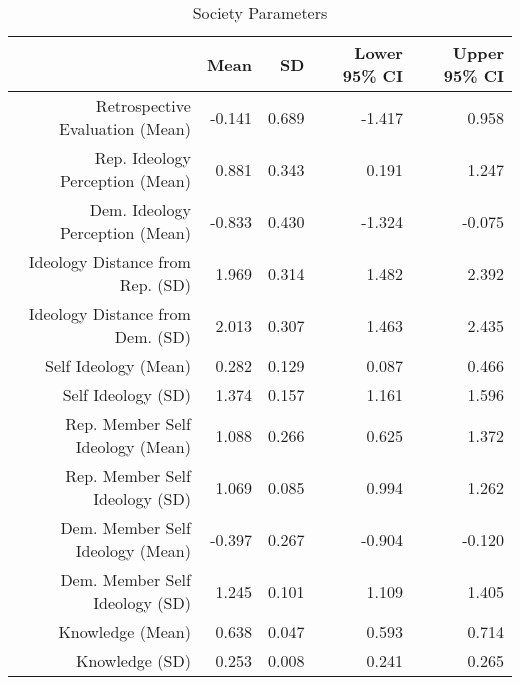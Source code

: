 \begin{table}[h!!!]
\centering
\caption{Society Parameters} 
\label{socparams}
\begin{tabular}{rrrrr}
  \hline
 & Mean & SD & Lower 95\% CI & Upper 95\% CI \\ 
  \hline
Retrospective Evaluation (Mean) & -0.141 & 0.689 & -1.417 & 0.958 \\ 
  Rep. Ideology Perception (Mean) & 0.881 & 0.343 & 0.191 & 1.247 \\ 
  Dem. Ideology Perception (Mean) & -0.833 & 0.430 & -1.324 & -0.075 \\ 
  Ideology Distance from Rep. (SD) & 1.969 & 0.314 & 1.482 & 2.392 \\ 
  Ideology Distance from Dem. (SD) & 2.013 & 0.307 & 1.463 & 2.435 \\ 
  Self Ideology (Mean) & 0.282 & 0.129 & 0.087 & 0.466 \\ 
  Self Ideology (SD) & 1.374 & 0.157 & 1.161 & 1.596 \\ 
  Rep. Member Self Ideology (Mean) & 1.088 & 0.266 & 0.625 & 1.372 \\ 
  Rep. Member Self Ideology (SD) & 1.069 & 0.085 & 0.994 & 1.262 \\ 
  Dem. Member Self Ideology (Mean) & -0.397 & 0.267 & -0.904 & -0.120 \\ 
  Dem. Member Self Ideology (SD) & 1.245 & 0.101 & 1.109 & 1.405 \\ 
  Knowledge (Mean) & 0.638 & 0.047 & 0.593 & 0.714 \\ 
  Knowledge (SD) & 0.253 & 0.008 & 0.241 & 0.265 \\ 
   \hline
\end{tabular}
\end{table}
